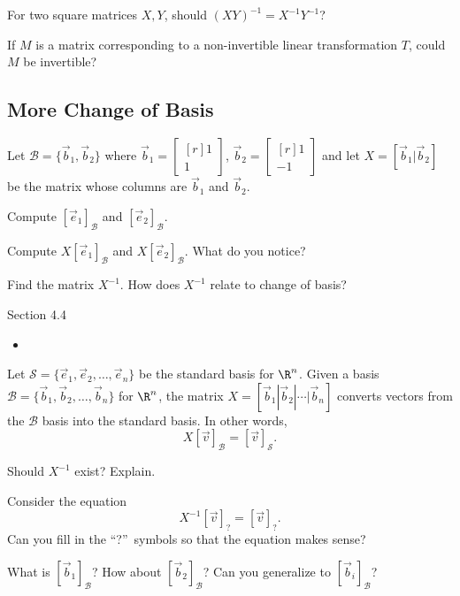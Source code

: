 \documentclass{problemset}
\newcommand{\mat}[1]{\begin{bmatrix*}[r]#1\end{bmatrix*}}
\begin{document}
	\question
	\begin{parts}
		\item For two square matrices $X,Y$, should $(XY)^{-1}=X^{-1}Y^{-1}$?
		\item If $M$ is a matrix corresponding to a non-invertible linear transformation $T$,
			could $M$ be invertible?
	\end{parts}

\subsection*{More Change of Basis}
	\question
	Let $\mathcal B=\{\vec b_1,\vec b_2\}$ where $\vec b_1=\mat{1\\1}$, $\vec b_2=\mat{1\\-1}$
	and let $X=[\vec b_1|\vec b_2]$ be the matrix whose columns are $\vec b_1$ and $\vec b_2$.
	\begin{parts}
		\item Compute $[\vec e_1]_{\mathcal B}$ and $[\vec e_2]_{\mathcal B}$.
		\item Compute $X[\vec e_1]_{\mathcal B}$ and $X[\vec e_2]_{\mathcal B}$.  
			What do you notice?
		\item Find the matrix $X^{-1}$. How does $X^{-1}$ relate to change of basis?
	\end{parts}

	
\begin{lesson}
	\newpage

	Section 4.4

	\begin{itemize}
		\item 
	\end{itemize}


	\newpage
\end{lesson}
	\question
	Let $\mathcal S=\{\vec e_1,\vec e_2,\ldots,\vec e_n\}$ be the standard basis for $\R^n$.
	Given a basis $\mathcal B=\{\vec b_1,\vec b_2,\ldots,\vec b_n\}$ for $\R^n$, the 
	matrix $X=[\vec b_1|\vec b_2|\cdots|\vec b_n]$ converts
	vectors from the $\mathcal B$ basis into the standard basis.  In other words,
	\[
		X[\vec v]_{\mathcal B} = [\vec v]_{\mathcal S}.
	\]
	\begin{parts}
		\item Should $X^{-1}$ exist? Explain.
		\item Consider the equation\[
				X^{-1}[\vec v]_{?} = [\vec v]_{?}.
			\]
			Can you fill in the ``?''~symbols so that the equation makes sense?
		\item What is $[\vec b_1]_{\mathcal B}$?  How about $[\vec b_2]_{\mathcal B}$?  Can
			you generalize to $[\vec b_i]_{\mathcal B}$?
	\end{parts}
\end{document}
